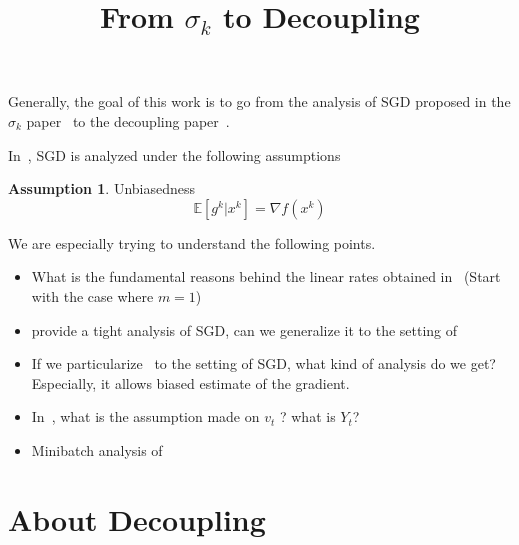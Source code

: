 \documentclass{article}
\title{From $\sigma_k$ to Decoupling}
\newcommand{\bE}{{\mathbb E}}
\theoremstyle{definition}
\newtheorem{assumption}{Assumption}
\begin{document}
\maketitle

\begin{abstract} 

\end{abstract}

Generally, the goal of this work is to go from the analysis of SGD proposed in the $\sigma_k$ paper~\cite{gorbunov2019unified} to the decoupling paper~\cite{mishchenko2019stochastic}.

In~\cite{gorbunov2019unified}, SGD is analyzed under the following assumptions 
\begin{assumption}
Unbiasedness
\begin{equation}
    \bE[g^k|x^k] = \nabla f(x^k)
\end{equation}
\end{assumption}

We are especially trying to understand the following points.
\begin{itemize}
    \item What is the fundamental reasons behind the linear rates obtained in~\cite{mishchenko2019stochastic} (Start with the case where $m=1$)
    \item \cite{gorbunov2019unified} provide a tight analysis of SGD, can we generalize it to the setting of~\cite{mishchenko2019stochastic}
    \item If we particularize~\cite{mishchenko2019stochastic} to the setting of SGD, what kind of analysis do we get? Especially, it allows biased estimate of the gradient.
    \item In~\cite{mishchenko2019stochastic}, what is the assumption made on $v_t$ ? what is $Y_t$?
    \item Minibatch analysis of~\cite{mishchenko2019stochastic} 
\end{itemize}
\section{About Decoupling}
\end{document}
